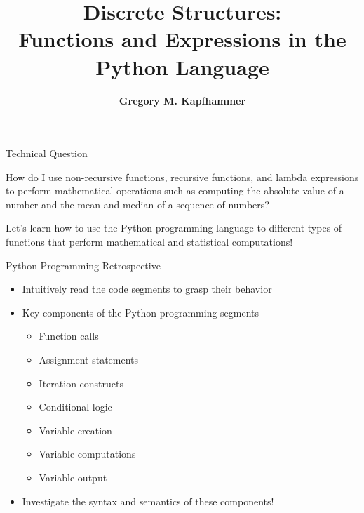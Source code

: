 \documentclass[14pt,aspectratio=169]{beamer}
\title{Discrete Structures: \\ Functions and Expressions in the Python Language}
\author{{\bf Gregory M. Kapfhammer}}
\institute[shortinst]{{\bf Department of Computer Science, Allegheny College}}
\begin{document}
{
  \begin{frame}
    \titlepage
  \end{frame}
}

%
\begin{frame}{Technical Question}
  \begin{center}
    {\large How do I use non-recursive functions, recursive functions, and
    lambda expressions to perform mathematical operations such as computing the
  absolute value of a number and the mean and median of a sequence of numbers?}
  \end{center}
  \vspace{2ex}
  \begin{center}
    \small Let's learn how to use the Python programming language to different
    types of functions that perform mathematical and statistical computations!
  \end{center}
\end{frame}

%
\begin{frame}{Python Programming Retrospective}
  \begin{itemize}
    \item Intuitively read the code segments to grasp their behavior
      \vspace*{-.15in}
    \item Key components of the Python programming segments
      \begin{itemize}
        \item Function calls
        \item Assignment statements
        \item Iteration constructs
        \item Conditional logic
        \item Variable creation
        \item Variable computations
        \item Variable output
      \end{itemize}
      \vspace*{-.2in}
    \item Investigate the syntax and semantics of these components!
  \end{itemize}
\end{frame}
\end{document}

